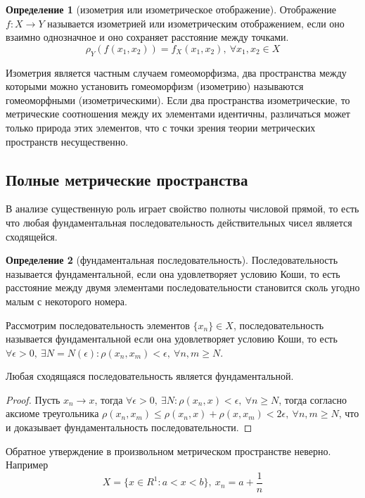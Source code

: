 \documentclass[14pt,a4paper]{extarticle}
\theoremstyle{definition}
\newtheorem{definition}{Определение}[section]
\theoremstyle{remark}
\renewcommand{\[}{\begin{dmath*}[compact]}
\renewcommand{\]}{\end{dmath*}}
\newcommand{\sep}{ , \ \allowbreak }
\newcommand\fr[2]{\dfrac{#1}{#2}}
\begin{document}
\begin{definition}[изометрия или изометрическое отображение]
  Отображение $f: X \to Y$ называется изометрией или
  изометрическим отображением,
  если оно взаимно однозначное и оно сохраняет расстояние между точками.
  \[ \rho_Y(f(x_1,x_2))=f_X(x_1,x_2) \sep {\forall x_1,x_2\in X}\]
\end{definition}

Изометрия является частным случаем гомеоморфизма, два пространства между
которыми можно установить гомеоморфизм (изометрию) называются гомеоморфными
(изометрическими). Если два пространства изометрические, то метрические
соотношения между их элементами идентичны, различаться может только природа
этих элементов, что с точки зрения теории метрических пространств несущественно.

\subsection{Полные метрические пространства}

В анализе существенную роль играет свойство полноты числовой прямой, то есть
что любая фундаментальная последовательность действительных чисел является
сходящейся.

\begin{definition}[фундаментальная последовательность]
  Последовательность называется фундаментальной,
  если она удовлетворяет условию Коши,
  то есть расстояние между двумя элементами последовательности становится сколь
  угодно малым с некоторого номера.
\end{definition}

Рассмотрим последовательность элементов $\{x_n\} \in X$,
последовательность называется фундаментальной если она удовлетворяет
условию Коши, то есть $ \forall \epsilon > 0 \sep \exists N = N(\epsilon):
\rho(x_n, x_m) < \epsilon \sep \forall n, m \geq N $.

Любая сходящаяся последовательность является фундаментальной.

\begin{proof}
  Пусть $x_n \to x$, тогда
  $\forall \epsilon > 0 \sep \exists N: \rho(x_n, x) < \epsilon \sep
  \forall n \geq N$,
  тогда согласно аксиоме треугольника
  $\rho(x_n, x_m) \leq \rho(x_n, x)+\rho(x, x_m) < 2\epsilon \sep
  \forall n, m \geq N$,
  что и доказывает фундаментальность последовательности.
\end{proof}

Обратное утверждение в произвольном метрическом пространстве неверно.
Например \[ {X = \{x \in R^1: a < x < b\}} \sep {x_n = a + \fr{1}{n}}\] %
\end{document}
